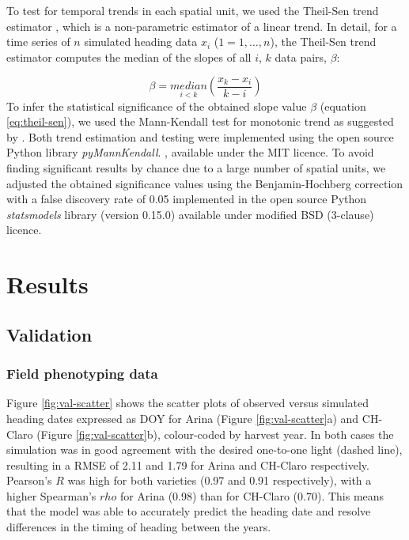 To test for temporal trends in each spatial unit, we used the Theil-Sen trend estimator \citep{theil_rank-invariant_1950, sen_estimates_1968}, which is a non-parametric estimator of a linear trend. In detail, for a time series of $n$ simulated heading data $x_i$ ($1 = 1, \dots, n$), the Theil-Sen trend estimator computes the median of the slopes of all $i$, $k$ data pairs, $\beta$:

\begin{equation}
\label{eq:theil-sen}
    \beta = \underset{i < k}{median} \left(\frac{x_k - x_i}{k - i}\right)
\end{equation}
To infer the statistical significance of the obtained slope value $\beta$ (equation \ref{eq:theil-sen}), we used the Mann-Kendall test for monotonic trend \citep{mann_nonparametric_1945, kendall_rank_1975} as suggested by \cite{hu_earlier_2005}. Both trend estimation and testing were implemented using the open source Python library \textsl{pyMannKendall}. \citep{hussain_pymannkendall_2019}, available under the MIT licence. To avoid finding significant results by chance due to a large number of spatial units, we adjusted the obtained significance values using the Benjamin-Hochberg correction \citep{benjamini_controlling_1995} with a false discovery rate of 0.05 implemented in the open source Python \textsl{statsmodels} library \citep{seabold_statsmodels_2010} (version 0.15.0) available under modified BSD (3-clause) licence.


\section{Results}
\label{sec:hd-results}
\subsection{Validation}
\subsubsection{Field phenotyping data}
\label{subsubsec:res-phenotyping}
Figure \ref{fig:val-scatter} shows the scatter plots of observed versus simulated heading dates expressed as \gls{DOY} for Arina (Figure \ref{fig:val-scatter}a) and CH-Claro (Figure \ref{fig:val-scatter}b), colour-coded by harvest year. In both cases the simulation was in good agreement with the desired one-to-one light (dashed line), resulting in a \gls{RMSE} of 2.11 and 1.79 for Arina and CH-Claro respectively. Pearson's $R$ was high for both varieties (0.97 and 0.91 respectively), with a higher Spearman's $rho$ for Arina (0.98) than for CH-Claro (0.70). This means that the model was able to accurately predict the heading date and resolve differences in the timing of heading between the years.

